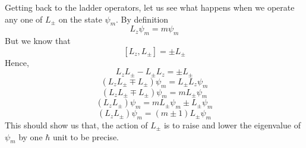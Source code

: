 \documentclass[12pt]{article}
\begin{document}
Getting back to the ladder operators, let us see what happens when we operate any one of $L_{\pm}$ on the state $\psi_m$. By definition $$L_z\psi_m = m\psi_m$$ But we know that $$[L_z, L_{\pm}] = \pm L_{\pm}$$ Hence,
$$L_zL_{\pm} - L_{\pm}L_z = \pm L_{\pm}$$
$$(L_zL_{\pm} \mp L_{\pm})\psi_m = L_{\pm}L_z\psi_m$$ 
$$(L_zL_{\pm} \mp L_{\pm})\psi_m = mL_{\pm}\psi_m$$
$$(L_zL_{\pm})\psi_m  = mL_{\pm}\psi_m\pm L_{\pm}\psi_m$$
$$(L_zL_{\pm})\psi_m = (m \pm 1)L_{\pm}\psi_m$$
This should show us that, the action of $L_{\pm}$ is to raise and lower the eigenvalue of $\psi_m$ by one $\hbar$ unit to be precise.
\end{document}
